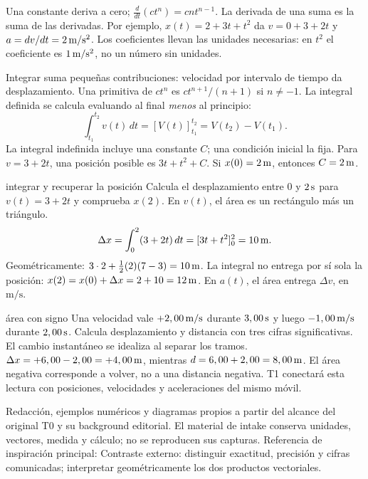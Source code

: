 \documentclass[11pt,a4paper]{article}
\begin{document}
Una constante deriva a cero; $\frac{d}{dt}(ct^n)=cnt^{n-1}$.
La derivada de una suma es la suma de las derivadas. Por ejemplo,
$x(t)=2+3t+t^2$ da $v=0+3+2t$ y $a=dv/dt=2\,\mathrm{m/s^2}$.
Los coeficientes llevan las unidades necesarias: en $t^2$ el coeficiente es
$1\,\mathrm{m/s^2}$, no un n\'umero sin unidades.

Integrar suma peque\~nas contribuciones: velocidad por intervalo de tiempo da
desplazamiento. Una primitiva de $ct^n$ es $ct^{n+1}/(n+1)$ si $n\ne-1$.
La integral definida se calcula evaluando al final \emph{menos} al principio:
\[
\int_{t_1}^{t_2}v(t)\,dt=[V(t)]_{t_1}^{t_2}=V(t_2)-V(t_1).
\]
La integral indefinida incluye una constante $C$; una condici\'on inicial la fija.
Para $v=3+2t$, una posici\'on posible es $3t+t^2+C$.
Si $x(0)=2\,\mathrm{m}$, entonces $C=2\,\mathrm{m}$.

\begin{examplebox}{integrar y recuperar la posici\'on}
 Calcula el desplazamiento entre $0$ y $2\,\mathrm{s}$ para
$v(t)=3+2t$ y comprueba $x(2)$.
\solutionblock
{} En $v(t)$, el \'area es un rect\'angulo m\'as un tri\'angulo.
\[
\Delta x=\int_0^2(3+2t)\,dt=[3t+t^2]_0^2=10\,\mathrm{m}.
\]
Geom\'etricamente: $3\cdot2+\tfrac12(2)(7-3)=10\,\mathrm{m}$.
 La integral no entrega por s\'i sola la posici\'on:
$x(2)=x(0)+\Delta x=2+10=12\,\mathrm{m}$.
En $a(t)$, el \'area entrega $\Delta v$, en $\mathrm{m/s}$.
\end{examplebox}

\begin{exercisebox}{\'area con signo}
Una velocidad vale $+2,00\,\mathrm{m/s}$ durante $3,00\,\mathrm{s}$ y luego
$-1,00\,\mathrm{m/s}$ durante $2,00\,\mathrm{s}$. Calcula desplazamiento y distancia con tres
cifras significativas. El cambio instant\'aneo se idealiza al separar los tramos.
\solutionblock
$\Delta x=+6,00-2,00=+4,00\,\mathrm{m}$, mientras $d=6,00+2,00=8,00\,\mathrm{m}$.
El \'area negativa corresponde a volver, no a una distancia negativa.
T1 conectar\'a esta lectura con posiciones, velocidades y aceleraciones del mismo m\'ovil.
\end{exercisebox}

Redacci\'on, ejemplos num\'ericos y diagramas propios a partir del alcance del
original T0 y su background editorial. El material de intake conserva unidades,
vectores, medida y c\'alculo; no se reproducen sus capturas.
Referencia de inspiraci\'on principal:
Contraste externo: distinguir exactitud, precisi\'on y cifras comunicadas; interpretar
geom\'etricamente los dos productos vectoriales.
\end{document}
